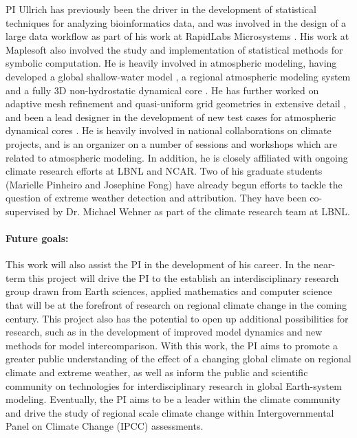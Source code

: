 \documentclass[11pt]{article}
\begin{document}
PI Ullrich has previously been the driver in the development of statistical techniques for analyzing bioinformatics data, and was involved in the design of a large data workflow as part of his work at RapidLabs Microsystems \citep{mikkelsen2005patent}.  His work at Maplesoft also involved the study and implementation of statistical methods for symbolic computation.  He is heavily involved in atmospheric modeling, having developed a global shallow-water model \citep{PAUCJBVL2010JCP}, a regional atmospheric modeling system \citep{PAUCJ2012MWR} and a fully 3D non-hydrostatic dynamical core \citep{PAUCJ2012JCP}.  He has further worked on adaptive mesh refinement and quasi-uniform grid geometries in extensive detail \citep{HJPCPMPAU2013MWR}, and been a lead designer in the development of new test cases for atmospheric dynamical cores \citep{PAUTMCJAS2013QJRMS,kent2013dcmip}.  He is heavily involved in national collaborations on climate projects, and is an organizer on a number of sessions and workshops which are related to atmospheric modeling.  In addition, he is closely affiliated with ongoing climate research efforts at LBNL and NCAR.  Two of his graduate students (Marielle Pinheiro and Josephine Fong) have already begun efforts to tackle the question of extreme weather detection and attribution.  They have been co-supervised by Dr. Michael Wehner as part of the climate research team at LBNL.

\paragraph{Future goals:}  This work will also assist the PI in the development of his career.  In the near-term this project will drive the PI to the establish an interdisciplinary research group drawn from Earth sciences, applied mathematics and computer science that will be at the forefront of research on regional climate change in the coming century.  This project also has the potential to open up additional possibilities for research, such as in the development of improved model dynamics and new methods for model intercomparison.  With this work, the PI aims to promote a greater public understanding of the effect of a changing global climate on regional climate and extreme weather, as well as inform the public and scientific community on technologies for interdisciplinary research in global Earth-system modeling.  Eventually, the PI aims to be a leader within the climate community and drive the study of regional scale climate change within Intergovernmental Panel on Climate Change (IPCC) assessments.
\end{document}
